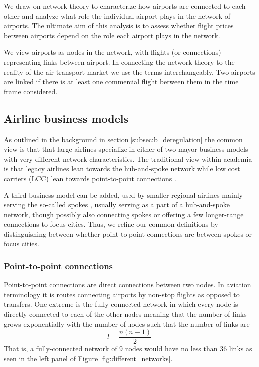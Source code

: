 \label{sec:theory}
We draw on network theory to characterize how airports are connected to each other and analyze what role the individual airport plays in the network of airports. The ultimate aim of this analysis is to assess whether flight prices between airports depend on the role each airport plays in the network.\par
We view airports as nodes in the network, with flights (or connections) representing links between airport. In connecting the network theory to the reality of the air transport market we use the terms interchangeably. Two airports are linked if there is at least one commercial flight between them in the time frame considered.

\subsection{Airline business models}
As outlined in the background in section \ref{subsec:b_deregulation} the common view is that that large airlines specialize in either of two mayor business models with very different network characteristics. The traditional view within academia is that legacy airlines lean towards the hub-and-spoke network while low cost carriers (LCC) lean towards point-to-point connections \citep{daraban2012low,baker2013service,marti2015efficiency}.
\par
A third business model can be added, used by smaller regional airlines mainly serving the so-called spokes \citep{forbes2007role}, usually serving as a part of a hub-and-spoke network, though possibly also connecting spokes or offering a few longer-range connections to focus cities. Thus, we refine our common definitions by distinguishing between whether point-to-point connections are between spokes or focus cities.

\subsubsection{Point-to-point connections}
Point-to-point connections are direct connections between two nodes. In aviation terminology it is routes connecting airports by non-stop flights as opposed to transfers. One extreme is the fully-connected network in which every node is directly connected to each of the other nodes meaning that the number of links grows exponentially with the number of nodes such that the number of links are
\begin{equation*}
  l=\frac{n(n-1)}{2}
\end{equation*}
That is, a fully-connected network of 9 nodes would have no less than 36 links as seen in the left panel of Figure \ref{fig:different_networks}.

